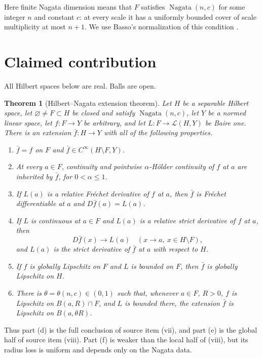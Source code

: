 \documentclass[11pt]{article}
\newtheorem{theorem}{Theorem}
\newcommand{\cL}{\mathcal L}
\begin{document}
Here finite Nagata dimension means that $F$ satisfies
$\operatorname{Nagata}(n,c)$ for some integer $n$ and constant $c$: at every
scale it has a uniformly bounded cover of scale multiplicity at most $n+1$.
We use Basso's normalization of this condition \cite{Basso}.

\section{Claimed contribution}

All Hilbert spaces below are real.  Balls are open.

\begin{theorem}[Hilbert--Nagata extension theorem]\label{thm:main}
Let $H$ be a separable Hilbert space, let $\varnothing\ne F\subset H$ be
closed and satisfy $\operatorname{Nagata}(n,c)$, let $Y$ be a normed linear
space, let $f:F\to Y$ be arbitrary, and let
$L:F\to\cL(H,Y)$ be Baire one.  There is an extension
$\bar f:H\to Y$ with all of the following properties.

\begin{enumerate}[label=(\alph*)]
\item $\bar f=f$ on $F$ and $\bar f\in C^\infty(H\setminus F,Y)$.
\item At every $a\in F$, continuity and pointwise $\alpha$-H\"older
continuity of $f$ at $a$ are inherited by $\bar f$, for $0<\alpha\le1$.
\item If $L(a)$ is a relative Fr\'echet derivative of $f$ at $a$, then
$\bar f$ is Fr\'echet differentiable at $a$ and
$D\bar f(a)=L(a)$.
\item If $L$ is continuous at $a\in F$ and $L(a)$ is a relative strict
derivative of $f$ at $a$, then
\[
 D\bar f(x)\longrightarrow L(a)
 \quad(x\to a,\ x\in H\setminus F),
\]
and $L(a)$ is the strict derivative of $\bar f$ at $a$ with respect to $H$.
\item If $f$ is globally Lipschitz on $F$ and $L$ is bounded on $F$, then
$\bar f$ is globally Lipschitz on $H$.
\item There is $\theta=\theta(n,c)\in(0,1)$ such that, whenever $a\in F$,
$R>0$, $f$ is Lipschitz on $B(a,R)\cap F$, and $L$ is bounded there, the
extension $\bar f$ is Lipschitz on $B(a,\theta R)$.
\end{enumerate}
\end{theorem}

Thus part (d) is the full conclusion of source item (vii), and part (e) is the
global half of source item (viii).  Part (f) is weaker than the local half of
(viii), but its radius loss is uniform and depends only on the Nagata data.
\end{document}
